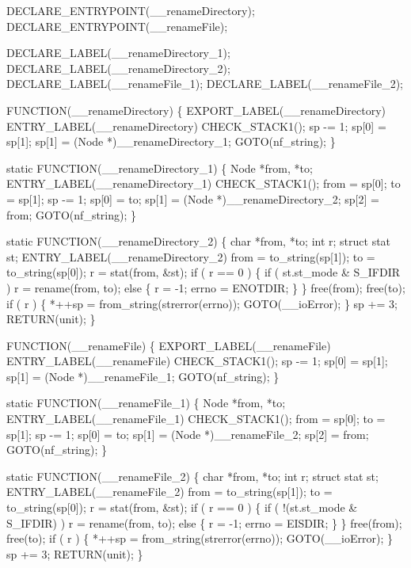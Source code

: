 \nwenddocs{}\plusendmoddef\nwstartdeflinemarkup{}\nwenddeflinemarkup
DECLARE_ENTRYPOINT(__renameDirectory);
DECLARE_ENTRYPOINT(__renameFile);

DECLARE_LABEL(__renameDirectory_1);
DECLARE_LABEL(__renameDirectory_2);
DECLARE_LABEL(__renameFile_1);
DECLARE_LABEL(__renameFile_2);

FUNCTION(__renameDirectory)
\{
    EXPORT_LABEL(__renameDirectory)
 ENTRY_LABEL(__renameDirectory)
    CHECK_STACK1();
    sp   -= 1;
    sp[0] = sp[1];
    sp[1] = (Node *)__renameDirectory_1;
    GOTO(nf_string);
\}

static
FUNCTION(__renameDirectory_1)
\{
    Node *from, *to;
 ENTRY_LABEL(__renameDirectory_1)
    CHECK_STACK1();
    from  = sp[0];
    to    = sp[1];
    sp   -= 1;
    sp[0] = to;
    sp[1] = (Node *)__renameDirectory_2;
    sp[2] = from;
    GOTO(nf_string);
\}

static
FUNCTION(__renameDirectory_2)
\{
    char        *from, *to;
    int         r;
    struct stat st;
 ENTRY_LABEL(__renameDirectory_2)
    from = to_string(sp[1]);
    to   = to_string(sp[0]);
    r    = stat(from, &st);
    if ( r == 0 )
    \{
        if ( st.st_mode & S_IFDIR )
            r = rename(from, to);
        else
        \{
            r     = -1;
            errno = ENOTDIR;
        \}
    \}
    free(from);
    free(to);
    if ( r )
    \{
        *++sp = from_string(strerror(errno));
        GOTO(__ioError);
    \}
    sp += 3;
    RETURN(unit);
\}

FUNCTION(__renameFile)
\{
    EXPORT_LABEL(__renameFile)
 ENTRY_LABEL(__renameFile)
    CHECK_STACK1();
    sp   -= 1;
    sp[0] = sp[1];
    sp[1] = (Node *)__renameFile_1;
    GOTO(nf_string);
\}

static
FUNCTION(__renameFile_1)
\{
    Node *from, *to;
 ENTRY_LABEL(__renameFile_1)
    CHECK_STACK1();
    from  = sp[0];
    to    = sp[1];
    sp   -= 1;
    sp[0] = to;
    sp[1] = (Node *)__renameFile_2;
    sp[2] = from;
    GOTO(nf_string);
\}

static
FUNCTION(__renameFile_2)
\{
    char        *from, *to;
    int         r;
    struct stat st;
 ENTRY_LABEL(__renameFile_2)
    from = to_string(sp[1]);
    to   = to_string(sp[0]);
    r    = stat(from, &st);
    if ( r == 0 )
    \{
        if ( !(st.st_mode & S_IFDIR) )
            r = rename(from, to);
        else
        \{
            r     = -1;
            errno = EISDIR;
        \}
    \}
    free(from);
    free(to);
    if ( r )
    \{
        *++sp = from_string(strerror(errno));
        GOTO(__ioError);
    \}
    sp += 3;
    RETURN(unit);
\}

